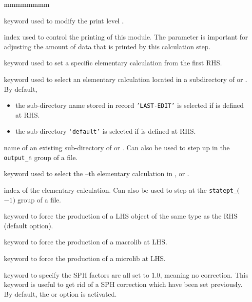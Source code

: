 \begin{ListeDeDescription}{mmmmmmmm}

\item[\moc{EDIT}] keyword used to modify the print level .

\item[\dusa{iprint}] index used to control the printing of this module. The
 parameter is important for adjusting the amount of data that is
printed by this calculation step.

\item[\moc{STEP}] keyword used to set a specific elementary calculation from the first RHS.

\item[\moc{UP}] keyword used to select an elementary calculation located in a subdirectory of  or . By default,
\begin{itemize}
\item the sub-directory name stored in record {\tt 'LAST-EDIT'} is selected if  is defined at RHS.
\item the sub-directory {\tt 'default'} is selected if  is defined at RHS.
\end{itemize}

\item[\dusa{NOMDIR}] name of an existing sub-directory of  or . Can also be used to step up in the {\tt output\_n}
group of a  file.

\item[\moc{AT}] keyword used to select the --th elementary calculation in ,  or .

\item[\dusa{index}] index of the elementary calculation. Can also be used to step at the {\tt statept\_}$($ $-1)$
group of a  file.

\item[\moc{IDEM}] keyword to force the production of a LHS object of the same type as the RHS (default option).

\item[\moc{MACRO}] keyword to force the production of a macrolib at LHS.

\item[\moc{MICRO}] keyword to force the production of a microlib at LHS.

\item[\moc{OFF}] keyword to specify the SPH factors are all set to 1.0,
meaning no correction. This keyword is useful to get rid of a SPH correction which have been set previously. By
default, the  or  option is activated.


\end{ListeDeDescription}
